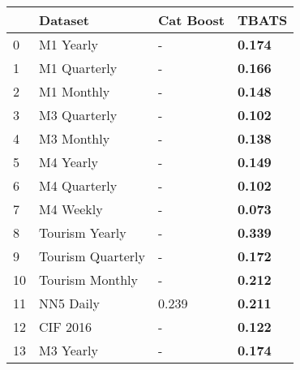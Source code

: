 \begin{tabular}{llll}
\toprule
 & Dataset & Cat Boost & TBATS \\
\midrule
0 & M1 Yearly & - & \textbf{0.174} \\
1 & M1 Quarterly & - & \textbf{0.166} \\
2 & M1 Monthly & - & \textbf{0.148} \\
3 & M3 Quarterly & - & \textbf{0.102} \\
4 & M3 Monthly & - & \textbf{0.138} \\
5 & M4 Yearly & - & \textbf{0.149} \\
6 & M4 Quarterly & - & \textbf{0.102} \\
7 & M4 Weekly & - & \textbf{0.073} \\
8 & Tourism Yearly & - & \textbf{0.339} \\
9 & Tourism Quarterly & - & \textbf{0.172} \\
10 & Tourism Monthly & - & \textbf{0.212} \\
11 & NN5 Daily & 0.239 & \textbf{0.211} \\
12 & CIF 2016 & - & \textbf{0.122} \\
13 & M3 Yearly & - & \textbf{0.174} \\
\bottomrule
\end{tabular}
